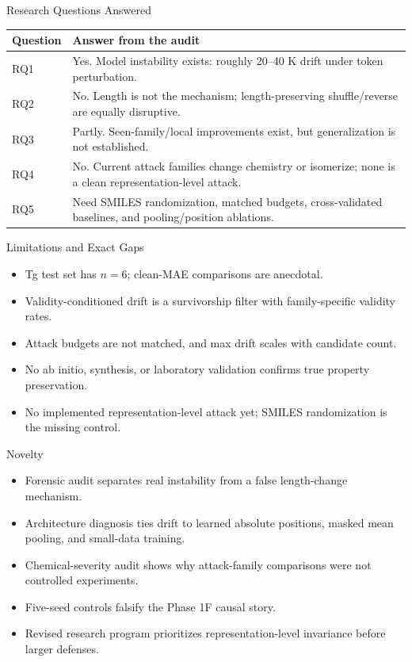 \documentclass[aspectratio=169,10pt]{beamer}
\begin{document}
\begin{frame}{Research Questions Answered}
\small
\begin{tabularx}{\textwidth}{@{}lX@{}}
\toprule
Question & Answer from the audit\\
\midrule
RQ1 & Yes. Model instability exists: roughly 20--40 K drift under token perturbation.\\
RQ2 & No. Length is not the mechanism; length-preserving shuffle/reverse are equally disruptive.\\
RQ3 & Partly. Seen-family/local improvements exist, but generalization is not established.\\
RQ4 & No. Current attack families change chemistry or isomerize; none is a clean representation-level attack.\\
RQ5 & Need SMILES randomization, matched budgets, cross-validated baselines, and pooling/position ablations.\\
\bottomrule
\end{tabularx}
\end{frame}

\begin{frame}{Limitations and Exact Gaps}
\begin{itemize}
  \item Tg test set has $n=6$; clean-MAE comparisons are anecdotal.
  \item Validity-conditioned drift is a survivorship filter with family-specific validity rates.
  \item Attack budgets are not matched, and max drift scales with candidate count.
  \item No ab initio, synthesis, or laboratory validation confirms true property preservation.
  \item No implemented representation-level attack yet; SMILES randomization is the missing control.
\end{itemize}
\end{frame}

\begin{frame}{Novelty}
\begin{itemize}
  \item Forensic audit separates real instability from a false length-change mechanism.
  \item Architecture diagnosis ties drift to learned absolute positions, masked mean pooling, and small-data training.
  \item Chemical-severity audit shows why attack-family comparisons were not controlled experiments.
  \item Five-seed controls falsify the Phase 1F causal story.
  \item Revised research program prioritizes representation-level invariance before larger defenses.
\end{itemize}
\end{frame}
\end{document}
